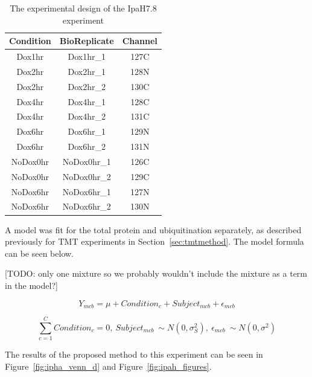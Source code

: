 \documentclass{mcp}
\def\todo#1{{\color{red}[TODO: #1]}}
\def\sfigref#1{{Figure~\ref{#1}}}
\begin{document}
\begin{table}[h!]
\centering
\begin{tabular}{| c | c | c |}
\hline
 Condition & BioReplicate & Channel \\ [0.5ex]
 \hline\hline
 Dox1hr & Dox1hr\_1 & 127C\\
 \hline
 Dox2hr & Dox2hr\_1 & 128N\\
\hline
 Dox2hr & Dox2hr\_2 & 130C\\
\hline
 Dox4hr & Dox4hr\_1 & 128C\\
\hline
 Dox4hr & Dox4hr\_2 & 131C\\
\hline
 Dox6hr & Dox6hr\_1 & 129N\\
\hline
 Dox6hr & Dox6hr\_2 & 131N\\
\hline
 NoDox0hr & NoDox0hr\_1 & 126C\\
\hline
 NoDox0hr & NoDox0hr\_2 & 129C\\
\hline
 NoDox6hr & NoDox6hr\_1 & 127N\\
\hline
 NoDox6hr & NoDox6hr\_2 & 130N\\
\hline

\end{tabular}
\caption{The experimental design of the IpaH7.8 experiment}
\label{table:ipah_design}
\end{table}

A model was fit for the total protein and ubiquitination separately, as described previously for TMT experiments in Section~\ref{sec:tmtmethod}. The model formula can be seen below.

\todo{only one mixture so we probably wouldn't include the mixture as a term in the model?}

$$Y_{mcb} = \mu + Condition_c + Subject_{mcb} + \epsilon_{mcb}$$

$$\sum_{c=1}^C{Condition_c} = 0 ,\: Subject_{mcb} ~ \sim N(0, \sigma^2_S) ,\: \epsilon_{mcb} ~ \sim N(0, \sigma^2)$$

The results of the proposed method to this experiment can be seen in \sfigref{fig:ipha_venn_d} and \sfigref{fig:ipah_figures}.
\end{document}

